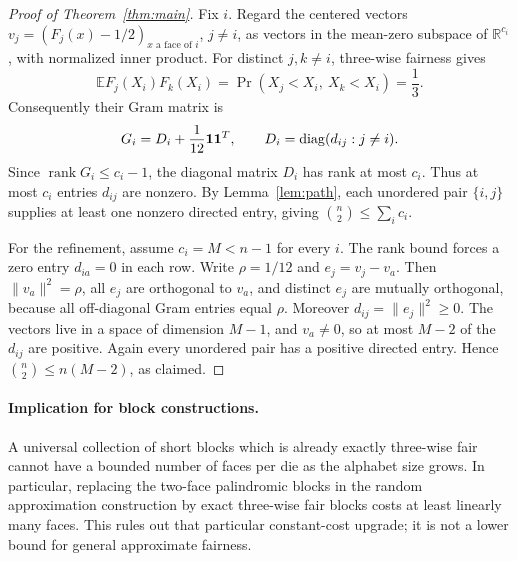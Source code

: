 \documentclass[11pt]{article}
\begin{document}
\begin{proof}[Proof of Theorem~\ref{thm:main}]
Fix $i$. Regard the centered vectors
$v_j=(F_j(x)-1/2)_{x\text{ a face of }i}$, $j\ne i$, as vectors in
the mean-zero subspace of $\mathbb R^{c_i}$, with normalized inner product.
For distinct $j,k\ne i$, three-wise fairness gives
\[
 \mathbb E F_j(X_i)F_k(X_i)
 =\Pr(X_j<X_i,\ X_k<X_i)=\frac13.
\]
Consequently their Gram matrix is
\[
 G_i=D_i+\frac1{12}{\bf1}{\bf1}^{T},
 \qquad D_i=\operatorname{diag}(d_{ij}:j\ne i).
\]
Since $\operatorname{rank}G_i\le c_i-1$, the diagonal matrix $D_i$
has rank at most $c_i$. Thus at most $c_i$ entries $d_{ij}$ are nonzero.
By Lemma~\ref{lem:path}, each unordered pair $\{i,j\}$ supplies at least
one nonzero directed entry, giving $\binom n2\le\sum_i c_i$.

For the refinement, assume $c_i=M<n-1$ for every $i$. The rank bound
forces a zero entry $d_{ia}=0$ in each row. Write $\rho=1/12$ and
$e_j=v_j-v_a$. Then $\|v_a\|^2=\rho$, all $e_j$ are orthogonal to
$v_a$, and distinct $e_j$ are mutually orthogonal, because all off-diagonal
Gram entries equal $\rho$. Moreover $d_{ij}=\|e_j\|^2\ge0$.
The vectors live in a space of dimension $M-1$, and $v_a\ne0$, so at
most $M-2$ of the $d_{ij}$ are positive. Again every unordered pair has
a positive directed entry. Hence $\binom n2\le n(M-2)$, as claimed.
\end{proof}

\paragraph{Implication for block constructions.}
A universal collection of short blocks which is already exactly
three-wise fair cannot have a bounded number of faces per die as the
alphabet size grows. In particular, replacing the two-face palindromic
blocks in the random approximation construction by exact three-wise fair
blocks costs at least linearly many faces. This rules out that particular
constant-cost upgrade; it is not a lower bound for general approximate
fairness.
\end{document}
